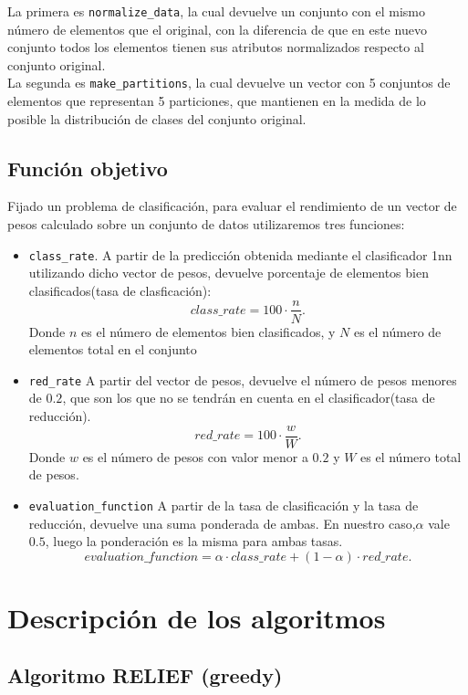 \documentclass[size=a4, parskip=half, titlepage=false, toc=flat, toc=bib, 12pt]{scrartcl}
\begin{document}
La primera es \texttt{normalize\_data}, la cual devuelve un conjunto con el mismo número de elementos que el original, con la diferencia de que en este nuevo conjunto todos los elementos tienen sus atributos normalizados respecto al conjunto original. \\

La segunda es \texttt{make\_partitions}, la cual devuelve un vector con 5 conjuntos de elementos que representan 5 particiones, que mantienen en la medida de lo posible la distribución de clases del conjunto original.\\

\subsection{Función objetivo}
Fijado un problema de clasificación, para evaluar el rendimiento de un vector de pesos calculado sobre un conjunto de datos utilizaremos tres funciones:
\begin{itemize}
    \item \texttt{class\_rate}. A partir de la predicción obtenida mediante el clasificador 1nn utilizando dicho vector de pesos, devuelve porcentaje de elementos bien clasificados(tasa de clasficación):
    \[
    class\_rate = 100 \cdot \frac{n}{N}
    .\]
Donde $n$ es el número de elementos bien clasificados, y $N$ es el número de elementos total en el conjunto
    \item \texttt{red\_rate} A partir del vector de pesos, devuelve el número de pesos menores de $0.2$, que son los que no se tendrán en cuenta en el clasificador(tasa de reducción).
    \[
    red\_rate = 100 \cdot \frac{w}{W}
    .\]
Donde $w$ es el número de pesos con valor menor a $0.2$ y $W$ es el número total de pesos.
    \item \texttt{evaluation\_function} A partir de la tasa de clasificación y la tasa de reducción, devuelve una suma ponderada de ambas. En nuestro caso,$\alpha$ vale $0.5$, luego la ponderación es la misma para ambas tasas.
    \[
    evaluation\_function = \alpha \cdot class\_rate + (1-\alpha)\cdot red\_rate
    .\]
\end{itemize}

\newpage
\section{Descripción de los algoritmos}
\subsection{Algoritmo RELIEF (greedy)}
\end{document}
